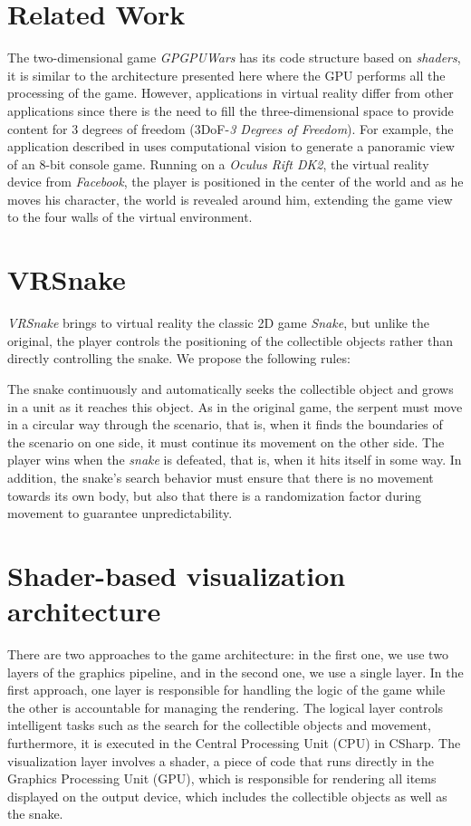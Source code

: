 \documentclass[12pt]{article}
\begin{document}
\section{Related Work}
The two-dimensional game \textit{GPGPUWars} \cite{GPGPUWars} has its code structure based on \textit{shaders}, it is similar to the architecture presented here where the GPU performs all the processing of the game. However, applications in virtual reality differ from other applications since there is the need to fill the three-dimensional space to provide content for 3 degrees of freedom (3DoF-\textit{3 Degrees of Freedom}). For example, the application described in \cite{zund2015unfolding} uses computational vision to generate a panoramic view of an 8-bit console game. Running on a \textit{Oculus Rift DK2}, the virtual reality device from \textit{Facebook}, the player is positioned in the center of the world and as he moves his character, the world is revealed around him, extending the game view to the four walls of the virtual environment.

\section{VRSnake} \label{sec:vrsnake}
\textit{VRSnake} brings to virtual reality the classic 2D game \textit{Snake}, but unlike the original, the player controls the positioning of the collectible objects rather than directly controlling the snake. We propose the following rules: 

The snake continuously and automatically seeks the collectible object and grows in a unit as it reaches this object. As in the original game, the serpent must move in a circular way through the scenario, that is, when it finds the boundaries of the scenario on one side, it must continue its movement on the other side. The player wins when the \textit{snake} is defeated, that is, when it hits itself in some way. In addition, the snake's search behavior must ensure that there is no movement towards its own body, but also that there is a randomization factor during movement to guarantee unpredictability.

\section{Shader-based visualization architecture}
 \label{sec:architecture}
There are two approaches to the game architecture: in the first one, we use two layers of the graphics pipeline, and in the second one, we use a single layer. In the first approach, one layer is responsible for handling the logic of the game while the other is accountable for managing the rendering.  The logical layer controls intelligent tasks such as the search for the collectible objects and movement, furthermore, it is executed in the Central Processing Unit (CPU) in CSharp. The visualization layer involves a shader, a piece of code that runs directly in the Graphics Processing Unit (GPU), which is responsible for rendering all items displayed on the output device, which includes the collectible objects as well as the snake.
\end{document}
